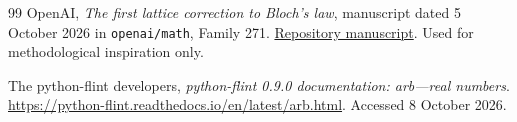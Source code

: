 \documentclass[11pt,a4paper]{article}
\numberwithin{equation}{section}
\theoremstyle{definition}
\begin{document}
\begin{thebibliography}{99}
OpenAI, \emph{The first lattice correction to Bloch's law},
manuscript dated 5 October 2026 in \texttt{openai/math}, Family 271.
\href{https://github.com/openai/math/blob/main/preprints/The-first-lattice-correction-to-Blochs-law-October-5-2026/first-lattice-correction-bloch-law.pdf}{Repository manuscript}.
Used for methodological inspiration only.

The python-flint developers,
\emph{python-flint 0.9.0 documentation: arb---real numbers}.
\url{https://python-flint.readthedocs.io/en/latest/arb.html}.
Accessed 8 October 2026.

\end{thebibliography}
\end{document}
